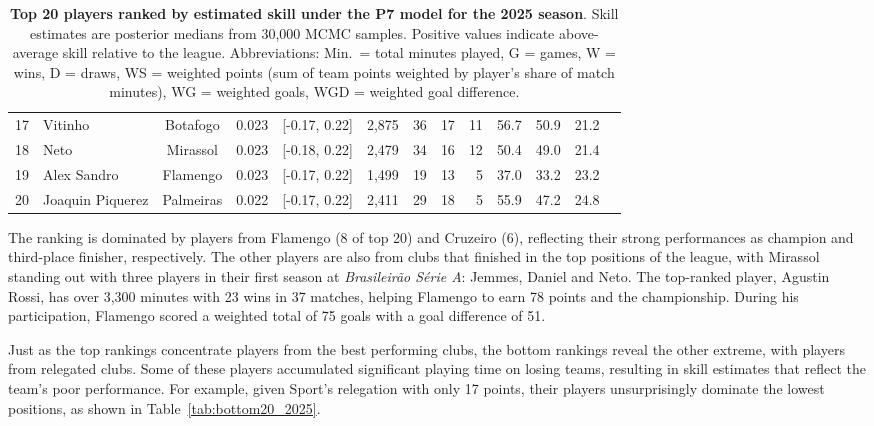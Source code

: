 \begin{table}[htbp]
\begin{tabular}{rlcccrrrrrrrr}
        17 & Vitinho & Botafogo & 0.023 & [-0.17, 0.22] & 2,875 & 36 & 17 & 11 & 56.7 & 50.9 & 21.2 \\
        18 & Neto & Mirassol & 0.023 & [-0.18, 0.22] & 2,479 & 34 & 16 & 12 & 50.4 & 49.0 & 21.4 \\
        19 & Alex Sandro & Flamengo & 0.023 & [-0.17, 0.22] & 1,499 & 19 & 13 & 5 & 37.0 & 33.2 & 23.2 \\
        20 & Joaquin Piquerez & Palmeiras & 0.022 & [-0.17, 0.22] & 2,411 & 29 & 18 & 5 & 55.9 & 47.2 & 24.8 \\
        \bottomrule
    \end{tabular}
    \caption{
        \textbf{Top 20 players ranked by estimated skill under the P7 model for the 2025 season}.
        Skill estimates are posterior medians from 30,000 MCMC samples.
        Positive values indicate above-average skill relative to the league.
        Abbreviations: Min.\ = total minutes played, G = games, W = wins, D = draws, WS = weighted points (sum of team points weighted by player's share of match minutes), WG = weighted goals, WGD = weighted goal difference.
    }
    \label{tab:top20_2025}
\end{table}

The ranking is dominated by players from Flamengo (8 of top 20) and Cruzeiro (6), reflecting their strong performances as champion and third-place finisher, respectively.
The other players are also from clubs that finished in the top positions of the league, with Mirassol standing out with three players in their first season at \textit{Brasileirão Série A}: Jemmes, Daniel and Neto.
The top-ranked player, Agustin Rossi, has over 3,300 minutes with 23 wins in 37 matches, helping Flamengo to earn 78 points and the championship.
During his participation, Flamengo scored a weighted total of 75 goals with a goal difference of 51.

Just as the top rankings concentrate players from the best performing clubs, the bottom rankings reveal the other extreme, with players from relegated clubs.
Some of these players accumulated significant playing time on losing teams, resulting in skill estimates that reflect the team's poor performance.
For example, given Sport's relegation with only 17 points, their players unsurprisingly dominate the lowest positions, as shown in Table~\ref{tab:bottom20_2025}.

